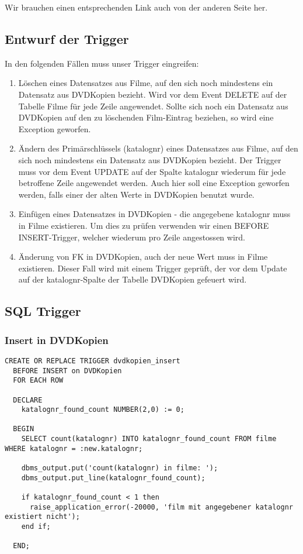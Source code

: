 \documentclass[11pt,a4paper,parskip=half]{scrartcl}
\begin{document}
Wir brauchen einen entsprechenden Link auch von der anderen Seite her.

\subsection{Entwurf der Trigger}
In den folgenden Fällen muss unser Trigger eingreifen:
\begin{enumerate}
	\item{Löschen eines Datensatzes aus Filme, auf den sich noch mindestens ein Datensatz aus DVDKopien bezieht. Wird vor dem Event DELETE auf der Tabelle Filme für jede Zeile angewendet. Sollte sich noch ein Datensatz aus DVDKopien auf den zu löschenden Film-Eintrag beziehen, so wird eine Exception geworfen.}
	\item{Ändern des Primärschlüssels (katalognr) eines Datensatzes aus Filme, auf den sich noch mindestens ein Datensatz aus DVDKopien bezieht. Der Trigger muss vor dem Event UPDATE auf der Spalte katalognr wiederum für jede betroffene Zeile angewendet werden. Auch hier soll eine Exception geworfen werden, falls einer der alten Werte in DVDKopien benutzt wurde.}
	\item{Einfügen eines Datensatzes in DVDKopien - die angegebene katalognr muss in Filme existieren. Um dies zu prüfen verwenden wir einen BEFORE INSERT-Trigger, welcher wiederum pro Zeile angestossen wird.}
	\item{Änderung von FK in DVDKopien, auch der neue Wert muss in Filme existieren. Dieser Fall wird mit einem Trigger geprüft, der vor dem Update auf der katalognr-Spalte der Tabelle DVDKopien gefeuert wird.}
\end{enumerate}

\subsection{SQL Trigger}
\subsubsection{Insert in DVDKopien}
\begin{lstlisting}
CREATE OR REPLACE TRIGGER dvdkopien_insert
  BEFORE INSERT on DVDKopien
  FOR EACH ROW
  
  DECLARE
    katalognr_found_count NUMBER(2,0) := 0;
    
  BEGIN
    SELECT count(katalognr) INTO katalognr_found_count FROM filme WHERE katalognr = :new.katalognr;
    
    dbms_output.put('count(katalognr) in filme: ');
    dbms_output.put_line(katalognr_found_count);
    
    if katalognr_found_count < 1 then
      raise_application_error(-20000, 'film mit angegebener katalognr existiert nicht');
    end if;
    
  END;
\end{lstlisting}
\end{document}
